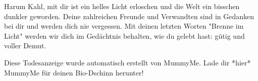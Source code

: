 \documentclass[final]{multiversum}
\begin{document}

Harum Kahl, mit dir ist ein helles Licht erloschen und die Welt ein bisschen dunkler geworden.
Deine zahlreichen Freunde und Verwandten sind in Gedanken bei dir und werden dich nie vergessen.
Mit deinen letzten Worten "Brenne im Licht" werden wir dich im Gedächtnis behalten, wie du gelebt hast: gütig und voller Demut.

Diese Todesanzeige wurde automatisch erstellt von MummyMe.
Lade dir *hier* MummyMe für deinen Bio-Dschinn herunter!



\end{document}
